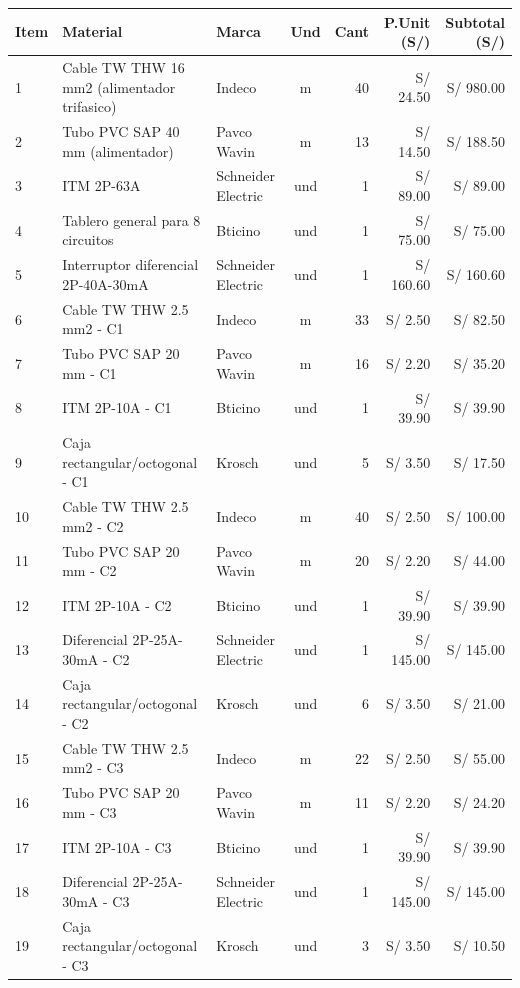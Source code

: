 \documentclass[11pt,a4paper]{article}
\begin{document}
\begin{table}[H]
\centering
\begin{small}
\begin{tabularx}{\textwidth}{l X l c r r r}
\toprule
\textbf{Item} & \textbf{Material} & \textbf{Marca} & \textbf{Und} & \textbf{Cant} & \textbf{P.Unit (S/)} & \textbf{Subtotal (S/)} \\
\midrule
1 & Cable TW THW 16 mm2 (alimentador trifasico) & Indeco & m & 40 & S/ 24.50 & S/ 980.00 \\
2 & Tubo PVC SAP 40 mm (alimentador) & Pavco Wavin & m & 13 & S/ 14.50 & S/ 188.50 \\
3 & ITM 2P-63A & Schneider Electric & und & 1 & S/ 89.00 & S/ 89.00 \\
4 & Tablero general para 8 circuitos & Bticino & und & 1 & S/ 75.00 & S/ 75.00 \\
5 & Interruptor diferencial 2P-40A-30mA & Schneider Electric & und & 1 & S/ 160.60 & S/ 160.60 \\
6 & Cable TW THW 2.5 mm2 - C1 & Indeco & m & 33 & S/ 2.50 & S/ 82.50 \\
7 & Tubo PVC SAP 20 mm - C1 & Pavco Wavin & m & 16 & S/ 2.20 & S/ 35.20 \\
8 & ITM 2P-10A - C1 & Bticino & und & 1 & S/ 39.90 & S/ 39.90 \\
9 & Caja rectangular/octogonal - C1 & Krosch & und & 5 & S/ 3.50 & S/ 17.50 \\
10 & Cable TW THW 2.5 mm2 - C2 & Indeco & m & 40 & S/ 2.50 & S/ 100.00 \\
11 & Tubo PVC SAP 20 mm - C2 & Pavco Wavin & m & 20 & S/ 2.20 & S/ 44.00 \\
12 & ITM 2P-10A - C2 & Bticino & und & 1 & S/ 39.90 & S/ 39.90 \\
13 & Diferencial 2P-25A-30mA - C2 & Schneider Electric & und & 1 & S/ 145.00 & S/ 145.00 \\
14 & Caja rectangular/octogonal - C2 & Krosch & und & 6 & S/ 3.50 & S/ 21.00 \\
15 & Cable TW THW 2.5 mm2 - C3 & Indeco & m & 22 & S/ 2.50 & S/ 55.00 \\
16 & Tubo PVC SAP 20 mm - C3 & Pavco Wavin & m & 11 & S/ 2.20 & S/ 24.20 \\
17 & ITM 2P-10A - C3 & Bticino & und & 1 & S/ 39.90 & S/ 39.90 \\
18 & Diferencial 2P-25A-30mA - C3 & Schneider Electric & und & 1 & S/ 145.00 & S/ 145.00 \\
19 & Caja rectangular/octogonal - C3 & Krosch & und & 3 & S/ 3.50 & S/ 10.50 \\

\end{tabularx}
\end{small}
\end{table}
\end{document}
